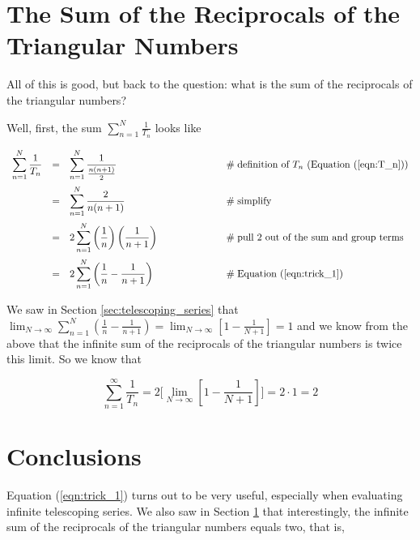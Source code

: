\documentclass{article}
\theoremstyle{definition}
\begin{document}
\bigskip
\section{The Sum of the Reciprocals of the Triangular Numbers}
\label{sec:reciprocals}
All of this is good, but back to the question: what is the sum of
the reciprocals of the triangular numbers? 

\bigskip
\noindent
Well, first, the sum ${\displaystyle \sum\limits_{n=1}^{N} \frac{1}{T_n}}$ 
looks like


\begin{equation*}
\begin{array}{lllll}
{\displaystyle \sum \limits_{n=1}^{N} \frac{1}{T_n}}
&=& {\displaystyle  \sum _{n=1}^{N} \frac{1}{\frac{n(n+1)}{2}}}
                &\qquad \qquad \qquad \mathrel{\#} \text{definition of $T_n$ 
                (Equation (\ref{eqn:T_n}))} \\
[15pt]
&=& {\displaystyle \sum _{n=1}^{N} \frac{2}{n (n+1)}}
                &\qquad \qquad \qquad \mathrel{\#} \text{simplify} \\
[15pt]
&=& {\displaystyle  2 \sum _{n=1}^{N} \left (\frac{1}{n} \right)
\left ( \frac{1}{n+1} \right )}
                &\qquad \qquad \qquad \mathrel{\#} \text{pull 2 out of the sum 
                and group terms} \\
[15pt]
&=& {\displaystyle  2 \sum\limits_{n=1}^N \left( \frac{1}{n} -
\frac{1}{n+1} \right)}
                &\qquad \qquad \qquad \mathrel{\#} 
                \text{Equation (\ref{eqn:trick_1})}
\end{array}
\end{equation*}

\bigskip
{ 
\noindent
We saw in Section \ref{sec:telescoping_series} that
${\displaystyle \lim_{N \to \infty} \sum\limits_{n=1}^N \left(
\frac{1}{n} - \frac{1}{n+1} \right ) = \lim_{N \to \infty} \left
[ 1 - \frac{1}{N+1} \right ] = 1}$ and we know from the above
that the infinite sum of the reciprocals of the triangular
numbers is twice this limit. So we know that \par}

\bigskip
\begin{equation*}
\sum \limits_{n=1}^{\infty} \frac{1}{T_n} = 2 \Bigg [  \lim_{N
\to \infty} \left  [ 1  - \frac{1}{N+1} \right ] \Bigg ]= 2 \cdot
1 =  2 
\end{equation*}


\section{Conclusions}
Equation (\ref{eqn:trick_1}) turns out to be very useful,
especially when evaluating infinite telescoping series. We also
saw in Section \ref{sec:reciprocals} that interestingly, the
infinite sum of the reciprocals of the triangular numbers equals
two, that is, 
\end{document}

